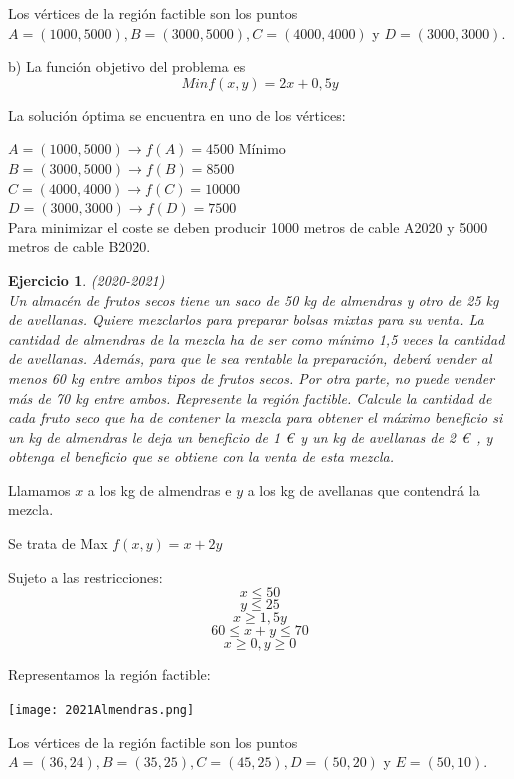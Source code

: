 \documentclass[12pt, a4paper]{amsart}
\newtheorem{ejer}{Ejercicio}
\newcommand{\s}{\color[rgb]{0,0,0.5}}
\newcommand{\n}{\color[rgb]{0,0,0}}
\begin{document}
Los vértices de la región factible son los puntos $A=(1000,5000), B=(3000,5000), C=(4000,4000)$ y $D=(3000,3000).$


b) La función objetivo del problema es \[Min f(x,y)=2x+0,5y\] 

La solución óptima se encuentra en uno de los vértices:

$A=(1000,5000) \rightarrow f(A)=4500$ Mínimo\\

$B=(3000,5000) \rightarrow f(B)=8500$\\

$C=(4000,4000) \rightarrow f(C)=10000$\\

$D=(3000,3000) \rightarrow f(D)=7500$\\

Para minimizar el coste se deben producir 1000 metros de cable A2020 y 5000 metros de cable B2020.
\n

\begin{ejer}\em (2020-2021)\\
Un almacén de frutos secos tiene un saco de 50 kg de almendras y otro de 25 kg de avellanas. Quiere mezclarlos para preparar bolsas mixtas para su venta. La cantidad de almendras de la mezcla ha de ser como mínimo 1,5 veces la cantidad de avellanas. Además, para que le sea rentable la preparación, deberá vender al menos 60 kg entre ambos tipos de frutos secos. Por otra parte, no puede vender más de 70 kg entre ambos. Represente la región factible. Calcule la cantidad de cada fruto seco que ha de contener la mezcla para obtener el máximo beneficio si un kg de almendras le deja un beneficio de 1 \euro\ y un kg de avellanas de 2 \euro\ , y obtenga el beneficio que se obtiene con la venta de esta mezcla.
\end{ejer}
 \s 
 
Llamamos $x$ a los kg de almendras e $y$ a los kg de avellanas que contendrá la mezcla.

Se trata de Max $f(x,y)=x+2y$

Sujeto a las restricciones:
\[x\leqslant 50\]
\[y\leqslant 25\]
\[x\geqslant 1,5y\]
\[60\leqslant x+y \leqslant 70\]
\[x\geqslant 0, y\geqslant 0\]


Representamos la región factible:
\begin{center}
\texttt{[image: 2021Almendras.png]}
\end{center}


Los vértices de la región factible son los puntos $A=(36,24), B=(35,25), C=(45,25), D=(50,20)$ y $E=(50,10).$
\end{document}
